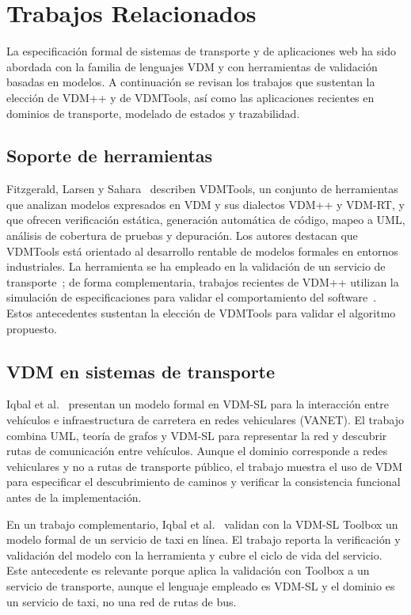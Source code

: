 \section{Trabajos Relacionados}
\label{sec:trabajos_relacionados}

La especificación formal de sistemas de transporte y de aplicaciones web ha sido abordada con la familia de lenguajes VDM y con herramientas de validación basadas en modelos. A continuación se revisan los trabajos que sustentan la elección de VDM++ y de VDMTools, así como las aplicaciones recientes en dominios de transporte, modelado de estados y trazabilidad.

\subsection{Soporte de herramientas}
Fitzgerald, Larsen y Sahara~\cite{fitzgerald2008} describen VDMTools, un conjunto de herramientas que analizan modelos expresados en VDM y sus dialectos VDM++ y VDM-RT, y que ofrecen verificación estática, generación automática de código, mapeo a UML, análisis de cobertura de pruebas y depuración. Los autores destacan que VDMTools está orientado al desarrollo rentable de modelos formales en entornos industriales. La herramienta se ha empleado en la validación de un servicio de transporte~\cite{iqbal2022taxi}; de forma complementaria, trabajos recientes de VDM++ utilizan la simulación de especificaciones para validar el comportamiento del software~\cite{matsumoto2024}. Estos antecedentes sustentan la elección de VDMTools para validar el algoritmo propuesto.

\subsection{VDM en sistemas de transporte}
Iqbal et al.~\cite{iqbal2022energies} presentan un modelo formal en VDM-SL para la interacción entre vehículos e infraestructura de carretera en redes vehiculares (VANET). El trabajo combina UML, teoría de grafos y VDM-SL para representar la red y descubrir rutas de comunicación entre vehículos. Aunque el dominio corresponde a redes vehiculares y no a rutas de transporte público, el trabajo muestra el uso de VDM para especificar el descubrimiento de caminos y verificar la consistencia funcional antes de la implementación.

En un trabajo complementario, Iqbal et al.~\cite{iqbal2022taxi} validan con la VDM-SL Toolbox un modelo formal de un servicio de taxi en línea. El trabajo reporta la verificación y validación del modelo con la herramienta y cubre el ciclo de vida del servicio. Este antecedente es relevante porque aplica la validación con Toolbox a un servicio de transporte, aunque el lenguaje empleado es VDM-SL y el dominio es un servicio de taxi, no una red de rutas de bus.

